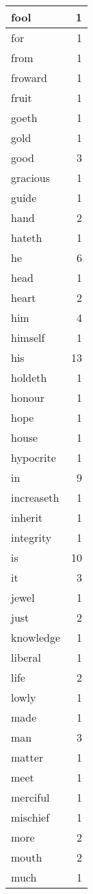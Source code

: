 \begin{center}
\begin{longtable}{l|r}
fool & 1\\ \hline 
for & 1\\ \hline 
from & 1\\ \hline 
froward & 1\\ \hline 
fruit & 1\\ \hline 
goeth & 1\\ \hline 
gold & 1\\ \hline 
good & 3\\ \hline 
gracious & 1\\ \hline 
guide & 1\\ \hline 
hand & 2\\ \hline 
hateth & 1\\ \hline 
he & 6\\ \hline 
head & 1\\ \hline 
heart & 2\\ \hline 
him & 4\\ \hline 
himself & 1\\ \hline 
his & 13\\ \hline 
holdeth & 1\\ \hline 
honour & 1\\ \hline 
hope & 1\\ \hline 
house & 1\\ \hline 
hypocrite & 1\\ \hline 
in & 9\\ \hline 
increaseth & 1\\ \hline 
inherit & 1\\ \hline 
integrity & 1\\ \hline 
is & 10\\ \hline 
it & 3\\ \hline 
jewel & 1\\ \hline 
just & 2\\ \hline 
knowledge & 1\\ \hline 
liberal & 1\\ \hline 
life & 2\\ \hline 
lowly & 1\\ \hline 
made & 1\\ \hline 
man & 3\\ \hline 
matter & 1\\ \hline 
meet & 1\\ \hline 
merciful & 1\\ \hline 
mischief & 1\\ \hline 
more & 2\\ \hline 
mouth & 2\\ \hline 
much & 1\\ \hline 

\end{longtable}
\end{center}
